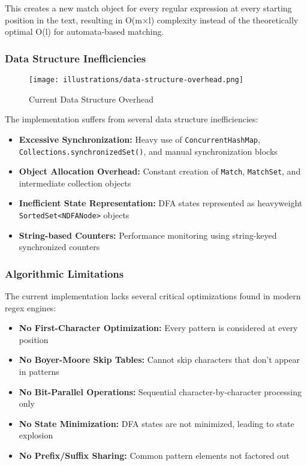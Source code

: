 \documentclass[11pt,a4paper]{article}
\begin{document}
This creates a new match object for every regular expression at every starting position in the text, resulting in O(m×l) complexity instead of the theoretically optimal O(l) for automata-based matching.

\subsubsection{Data Structure Inefficiencies}

\begin{figure}[htbp]
\centering
\texttt{[image: illustrations/data-structure-overhead.png]}
\caption{Current Data Structure Overhead}
\label{fig:data-overhead}
\end{figure}

The implementation suffers from several data structure inefficiencies:

\begin{itemize}
\item \textbf{Excessive Synchronization:} Heavy use of \texttt{ConcurrentHashMap}, \texttt{Collections.synchronizedSet()}, and manual synchronization blocks
\item \textbf{Object Allocation Overhead:} Constant creation of \texttt{Match}, \texttt{MatchSet}, and intermediate collection objects
\item \textbf{Inefficient State Representation:} DFA states represented as heavyweight \texttt{SortedSet<NDFANode>} objects
\item \textbf{String-based Counters:} Performance monitoring using string-keyed synchronized counters
\end{itemize}

\subsubsection{Algorithmic Limitations}

The current implementation lacks several critical optimizations found in modern regex engines:

\begin{itemize}
\item \textbf{No First-Character Optimization:} Every pattern is considered at every position
\item \textbf{No Boyer-Moore Skip Tables:} Cannot skip characters that don't appear in patterns
\item \textbf{No Bit-Parallel Operations:} Sequential character-by-character processing only
\item \textbf{No State Minimization:} DFA states are not minimized, leading to state explosion
\item \textbf{No Prefix/Suffix Sharing:} Common pattern elements not factored out
\end{itemize}
\end{document}
